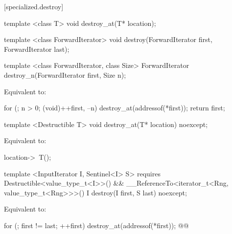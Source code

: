[specialized.destroy]{}
{\color{remclr}
\begin{codeblock}
template <class T>
  void destroy_at(T* location);
\end{codeblock}

\begin{codeblock}
template <class ForwardIterator>
  void destroy(ForwardIterator first, ForwardIterator last);
\end{codeblock}

\begin{codeblock}
template <class ForwardIterator, class Size>
  ForwardIterator destroy_n(ForwardIterator first, Size n);
\end{codeblock}

\setcounter{Paras}{2}
\pnum
\effects Equivalent to:
\begin{codeblock}
        for (; n > 0; (void)++first, --n)
          destroy_at(addressof(*first));
        return first;
\end{codeblock}
} %

{\color{addclr}
\begin{codeblock}
template <Destructible T>
  void destroy_at(T* location) noexcept;
\end{codeblock}
} %

\setcounter{Paras}{0}
\pnum
\effects Equivalent to:
\begin{codeblock}
        location->~T();
\end{codeblock}

{\color{addclr}
\begin{codeblock}
template <InputIterator I, Sentinel<I> S>
  requires Destructible<value_type_t<I>>() &&
           __ReferenceTo<iterator_t<Rng, value_type_t<Rng>>>()
    I destroy(I first, S last) noexcept;
\end{codeblock}
}

\pnum
\effects Equivalent to:
\begin{codeblock}
        for (; first != last; ++first)
          destroy_at(addressof(*first));
        @@
\end{codeblock}

